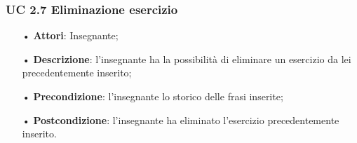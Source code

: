  
\subsubsection{UC 2.7 Eliminazione esercizio}
\begin{itemize}
	\item[•] \textbf{Attori}: Insegnante;
	\item[•] \textbf{Descrizione}: l'insegnante ha la possibilità di eliminare un esercizio da lei precedentemente inserito;
	\item[•] \textbf{Precondizione}: l'insegnante lo storico delle frasi inserite;
	\item[•] \textbf{Postcondizione}: l'insegnante ha eliminato l'esercizio precedentemente inserito.
\end{itemize}